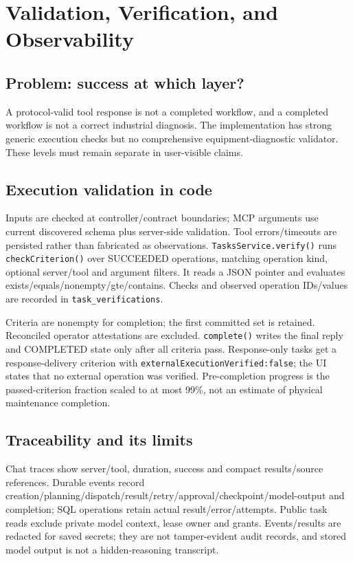 \chapter{Validation, Verification, and Observability}
\section{Problem: success at which layer?}
A protocol-valid tool response is not a completed workflow, and a completed workflow is not a correct industrial diagnosis. The implementation has strong generic execution checks but no comprehensive equipment-diagnostic validator. These levels must remain separate in user-visible claims.
\section{Execution validation in code}
Inputs are checked at controller/contract boundaries; MCP arguments use current discovered schema plus server-side validation. Tool errors/timeouts are persisted rather than fabricated as observations. \texttt{TasksService.verify()} runs \texttt{checkCriterion()} over SUCCEEDED operations, matching operation kind, optional server/tool and argument filters. It reads a JSON pointer and evaluates exists/equals/nonempty/gte/contains. Checks and observed operation IDs/values are recorded in \texttt{task\_verifications}.

Criteria are nonempty for completion; the first committed set is retained. Reconciled operator attestations are excluded. \texttt{complete()} writes the final reply and COMPLETED state only after all criteria pass. Response-only tasks get a response-delivery criterion with \texttt{externalExecutionVerified:false}; the UI states that no external operation was verified. Pre-completion progress is the passed-criterion fraction scaled to at most 99\%, not an estimate of physical maintenance completion.
\section{Traceability and its limits}
Chat traces show server/tool, duration, success and compact results/source references. Durable events record creation/planning/dispatch/result/retry/approval/checkpoint/model-output and completion; SQL operations retain actual result/error/attempts. Public task reads exclude private model context, lease owner and grants. Events/results are redacted for saved secrets; they are not tamper-evident audit records, and stored model output is not a hidden-reasoning transcript.

